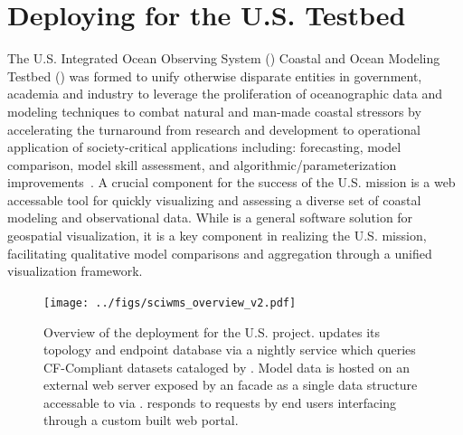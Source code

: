 \section{Deploying \sciwms{} for the U.S. \ioos{} \comt{} Testbed}

The U.S. Integrated Ocean Observing System (\ioos{}) Coastal and Ocean
Modeling Testbed (\comt{}) was formed to unify otherwise disparate
entities in government, academia and industry to leverage the
proliferation of oceanographic data and modeling techniques to combat
natural and man-made coastal stressors by accelerating the turnaround
from research and development to operational application of
society-critical applications including: forecasting, model
comparison, model skill assessment, and algorithmic/parameterization
improvements~\cite{luettich13}. A crucial component for the success of
the U.S. \ioos{} \comt{} mission is a web accessable tool for quickly
visualizing and assessing a diverse set of coastal modeling and
observational data. While \sciwms{} is a general software solution for
geospatial visualization, it is a key component in realizing the
U.S. \ioos{} \comt{} mission, facilitating qualitative model
comparisons and aggregation through a unified visualization framework.
\begin{figure}[ht!]
  \centering
  \texttt{[image: ../figs/sciwms\_overview\_v2.pdf]}
  \caption{Overview of the \sciwms{} deployment for the U.S. \ioos{}
    \comt{} project. \Sciwms{} updates its topology and endpoint
    database via a nightly service which queries CF-Compliant datasets
    cataloged by \ngdc{}. Model data is hosted on an external web
    server exposed by an \ncml{} facade as a single \netcdf{} data
    structure accessable to \sciwms{} via \opendap{}. \Sciwms{}
    responds to requests by end users interfacing through a custom built
    web portal.}
  \label{fig:overview1}
\end{figure}
